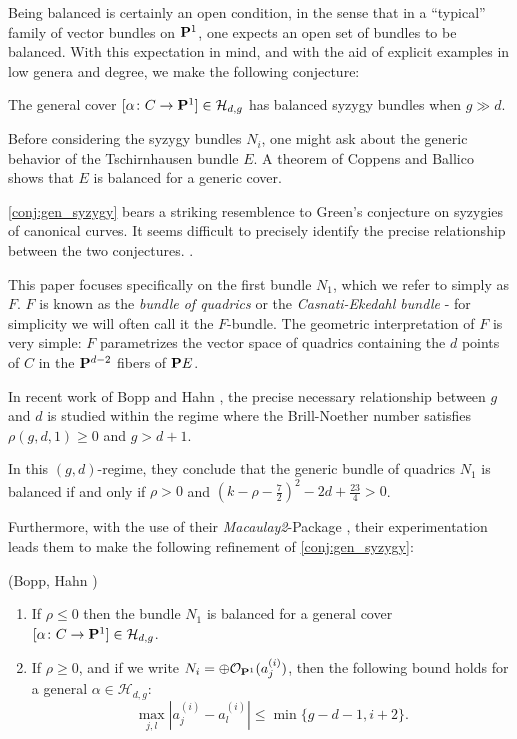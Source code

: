 \documentclass[11pt, two side, letterpaper, final]{amsart}
\renewcommand{\P}{{\bf P}}
\newcommand {\from}{\colon}
\renewcommand{\H}{{\mathcal{H}}}
\newcommand{\cO}{\mathcal{O}}
\begin{document}
Being balanced is certainly an open condition, in the sense that  in a ``typical''  family of vector bundles on $\P^{1}$, one expects an open set of bundles to be balanced.  With this expectation in mind, and with the aid of explicit examples in low genera and degree, we make the following conjecture:
\begin{conjecture}\label{conj:gen_syzygy}
The general cover $[\alpha \from C \to \P^1] \in \H_{d,g}$ has balanced syzygy bundles when $g \gg d$. 
\end{conjecture}

\begin{remark}
Before considering the syzygy bundles $N_{i}$, one might ask about the generic behavior of the Tschirnhausen bundle $E$.  A theorem of Coppens \cite{coppens_existence_1999} and Ballico \cite{ballico_remark_1989} shows that $E$ is balanced for a generic cover.
\end{remark}

\begin{remark}
\autoref{conj:gen_syzygy} bears a striking resemblence to Green's conjecture on syzygies of canonical curves.  It seems difficult to precisely identify the precise relationship between the two conjectures. \cite{Bopp-comm}.
\end{remark}



This paper focuses specifically on the first bundle $N_{1}$, which we refer to simply as $F$.   $F$ is known as the \emph{bundle of quadrics} or the \emph{Casnati-Ekedahl bundle} - for simplicity we will often  call it the $F$-bundle.  The geometric interpretation of $F$ is very simple: $F$ parametrizes the vector space of quadrics containing the $d$ points of $C$ in the $\P^{d-2}$ fibers of $\P E$.


In recent work of Bopp and Hahn \cite{bopp_syzygies_2014}, the precise necessary relationship between $g$ and $d$ is studied within the regime where the Brill-Noether number satisfies $\rho(g,d,1) \geq 0$ and $g > d+1$.

In this $(g,d)$-regime, they conclude that the generic bundle of quadrics $N_{1}$ is balanced if and only if $\rho > 0$ and $(k- \rho - \frac{7}{2})^{2} - 2d + \frac{23}{4} > 0$. 

Furthermore, with the use of their \emph{Macaulay2}-Package \cite{bopp_macaulay2_2015}, their experimentation leads them to make the following refinement of \cref{conj:gen_syzygy}: 
\begin{conjecture}\label{conj:ref_gen_syzygy}(Bopp, Hahn \cite{bopp_syzygies_2014})
\begin{enumerate}
\item If $\rho \leq 0$ then the bundle $N_{1}$ is balanced for a general cover $[\alpha \from C \to \P^{1}] \in \H_{d,g}$.
\item If $\rho \geq 0$, and if we write $N_{i} = \oplus \cO_{\P^{1}}(a^{(i)}_{j})$, then the following bound holds for a general $\alpha \in \H_{d,g}$: 
\[\max_{j,l}|a^{(i)}_{j} - a^{(i)}_{l}| \leq \min\{g-d-1, i+2\}. \]
\end{enumerate}

\end{conjecture}
\end{document}
